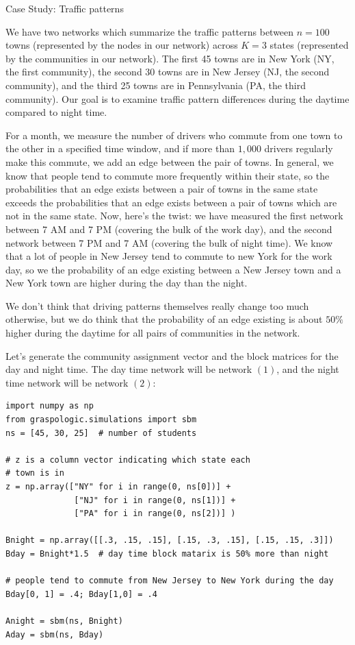 \begin{floatingbox}[h]\caption{Case Study: Traffic patterns}
We have two networks which summarize the traffic patterns between $n=100$ towns (represented by the nodes in our network) across $K=3$ states (represented by the communities in our network). The first 45 towns are in New York (NY, the first community), the second 30 towns are in New Jersey (NJ, the second community), and the third 25 towns are in Pennsylvania (PA, the third community). Our goal is to examine traffic pattern differences during the daytime compared to night time.

For a month, we measure the number of drivers who commute from one town to the other in a specified time window, and if more than $1,000$ drivers regularly make this commute, we add an edge between the pair of towns. In general, we know that people tend to commute more frequently within their state, so the probabilities that an edge exists between a pair of towns in the same state exceeds the probabilities that an edge exists between a pair of towns which are not in the same state. Now, here's the twist: we have measured the first network between 7 AM and 7 PM (covering the bulk of the work day), and the second network between 7 PM and 7 AM (covering the bulk of night time). We know that a lot of people in New Jersey tend to commute to new York for the work day, so we the probability of an edge existing between a New Jersey town and a New York town are higher during the day than the night.

We don't think that driving patterns themselves really change too much otherwise, but we do think that the probability of an edge existing is about $50\%$ higher during the daytime for all pairs of communities in the network.
\end{floatingbox}

Let's generate the community assignment vector and the block matrices for the day and night time. The day time network will be network $(1)$, and the night time network will be network $(2)$:
\begin{lstlisting}[style=python]
import numpy as np
from graspologic.simulations import sbm
ns = [45, 30, 25]  # number of students

# z is a column vector indicating which state each
# town is in
z = np.array(["NY" for i in range(0, ns[0])] + 
              ["NJ" for i in range(0, ns[1])] +
              ["PA" for i in range(0, ns[2])] )

Bnight = np.array([[.3, .15, .15], [.15, .3, .15], [.15, .15, .3]])
Bday = Bnight*1.5  # day time block matarix is 50% more than night

# people tend to commute from New Jersey to New York during the day
Bday[0, 1] = .4; Bday[1,0] = .4

Anight = sbm(ns, Bnight)
Aday = sbm(ns, Bday)
\end{lstlisting}

